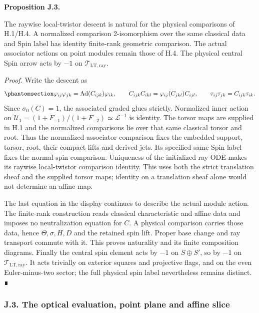 \documentclass[
  english,
  11pt,
  reqno]{amsart}
\makeatletter
\newcommand{\pandocstatementheading}[1]{%
  \par\addpenalty{\@beginparpenalty}%
  \addvspace{.5\baselineskip plus .2\baselineskip minus .2\baselineskip}%
  {\normalfont\bfseries #1\par}%
  \nobreak\@afterindenttrue\@afterheading
}
\makeatother
\begin{document}
\pandocstatementheading{\protect{}\label{prop:gg-ward-naturality}Proposition J.3.}

The raywise local-twistor descent is natural for the physical
comparisons of H.1/H.4. A normalized comparison 2-isomorphism over the
same classical data and Spin label has identity finite-rank geometric
comparison. The actual associator actions on point modules remain those
of H.4. The physical central Spin arrow acts by \(-1\) on
\(\mathcal T_{\mathrm{LT,ray}}\).

\emph{Proof.} Write the descent as
\begin{equation}\protect\phantomsection\label{eq:gg-ward-actual-associators}{
 \varphi_{ij}\varphi_{jk}
   =\operatorname{Ad}(C_{ijk})\varphi_{ik},\qquad
 C_{ijk}C_{ikl}=\varphi_{ij}(C_{jkl})C_{ijl},\qquad
 \tau_{ij}\tau_{jk}=C_{ijk}\tau_{ik}.
}\end{equation} Since \(\sigma_0(C)=1\), the associated graded glues
strictly. Normalized inner action on
\(\mathscr U_1=(1+F_{-1})/(1+F_{-2})\simeq\mathcal L^{-1}\) is identity.
The torsor maps are supplied in H.1 and the normalized comparisons lie
over that same classical torsor and root. Thus the normalized associator
comparison fixes the embedded support, torsor, root, their compact lifts
and derived jets. Its specified same Spin label fixes the normal spin
comparison. Uniqueness of the initialized ray ODE makes its raywise
local-twistor comparison identity. This uses both the strict translation
sheaf and the supplied torsor maps; identity on a translation sheaf
alone would not determine an affine map.

The last equation in the display continues to describe the actual module
action. The finite-rank construction reads classical characteristic and
affine data and imposes no neutralization equation for \(C\). A physical
comparison carries those data, hence \(\Theta,\sigma,H,D\) and the
retained spin lift. Proper base change and ray transport commute with
it. This proves naturality and its finite composition diagrams. Finally
the central spin element acts by \(-1\) on \(S\oplus S'\), so by \(-1\)
on \(\mathcal T_{\mathrm{LT,ray}}\). It acts trivially on exterior
squares and projective flags, and on the even Euler-minus-two sector;
the full physical spin label nevertheless remains distinct. ∎

\protect{}\label{sec:gg-optical-point-pencil}

\subsubsection{J.3. The optical evaluation, point plane and affine
slice}\label{j.3.-the-optical-evaluation-point-plane-and-affine-slice}
\end{document}

